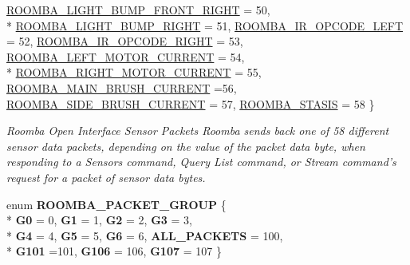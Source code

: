 \begin{DoxyCompactItemize}
\hyperlink{group__roomba-lib_gga46f008b5055c4a08d3123c6a3478373ea94217c4da645d2bed66a8ef46485b776}{R\+O\+O\+M\+B\+A\+\_\+\+L\+I\+G\+H\+T\+\_\+\+B\+U\+M\+P\+\_\+\+F\+R\+O\+N\+T\+\_\+\+R\+I\+G\+H\+T} = 50, 
\\*
\hyperlink{group__roomba-lib_gga46f008b5055c4a08d3123c6a3478373ead32d8a13d2506234d1358f7622725331}{R\+O\+O\+M\+B\+A\+\_\+\+L\+I\+G\+H\+T\+\_\+\+B\+U\+M\+P\+\_\+\+R\+I\+G\+H\+T} = 51, 
\hyperlink{group__roomba-lib_gga46f008b5055c4a08d3123c6a3478373ea9ebd0d5b7b0d25ab79377208546ed5bd}{R\+O\+O\+M\+B\+A\+\_\+\+I\+R\+\_\+\+O\+P\+C\+O\+D\+E\+\_\+\+L\+E\+F\+T} = 52, 
\hyperlink{group__roomba-lib_gga46f008b5055c4a08d3123c6a3478373eaea5b0df07c05b451fc103c732c6e74eb}{R\+O\+O\+M\+B\+A\+\_\+\+I\+R\+\_\+\+O\+P\+C\+O\+D\+E\+\_\+\+R\+I\+G\+H\+T} = 53, 
\hyperlink{group__roomba-lib_gga46f008b5055c4a08d3123c6a3478373eaeadd154f9f2f7647caf3488d27bd4fef}{R\+O\+O\+M\+B\+A\+\_\+\+L\+E\+F\+T\+\_\+\+M\+O\+T\+O\+R\+\_\+\+C\+U\+R\+R\+E\+N\+T} = 54, 
\\*
\hyperlink{group__roomba-lib_gga46f008b5055c4a08d3123c6a3478373ea7a02b4928368639e9bd9fcec9656462b}{R\+O\+O\+M\+B\+A\+\_\+\+R\+I\+G\+H\+T\+\_\+\+M\+O\+T\+O\+R\+\_\+\+C\+U\+R\+R\+E\+N\+T} = 55, 
\hyperlink{group__roomba-lib_gga46f008b5055c4a08d3123c6a3478373ea31137d3179ccc5981923bd6aa8b63b95}{R\+O\+O\+M\+B\+A\+\_\+\+M\+A\+I\+N\+\_\+\+B\+R\+U\+S\+H\+\_\+\+C\+U\+R\+R\+E\+N\+T} =56, 
\hyperlink{group__roomba-lib_gga46f008b5055c4a08d3123c6a3478373ea7c8ef5075b9ed0f0d6699c83d6359952}{R\+O\+O\+M\+B\+A\+\_\+\+S\+I\+D\+E\+\_\+\+B\+R\+U\+S\+H\+\_\+\+C\+U\+R\+R\+E\+N\+T} = 57, 
\hyperlink{group__roomba-lib_gga46f008b5055c4a08d3123c6a3478373ea0e892ee610c71a2a567e51ecd5d1e043}{R\+O\+O\+M\+B\+A\+\_\+\+S\+T\+A\+S\+I\+S} = 58
 \}
\begin{DoxyCompactList}\small\item\em Roomba Open Interface Sensor Packets Roomba sends back one of 58 different sensor data packets, depending on the value of the packet data byte, when responding to a Sensors command, Query List command, or Stream command’s request for a packet of sensor data bytes. \end{DoxyCompactList}\item 
\hypertarget{group__roomba-lib_ga159a5a543d2cf5401e5bd4c44c860ba0}{}enum {\bfseries R\+O\+O\+M\+B\+A\+\_\+\+P\+A\+C\+K\+E\+T\+\_\+\+G\+R\+O\+U\+P} \{ \\*
{\bfseries G0} = 0, 
{\bfseries G1} = 1, 
{\bfseries G2} = 2, 
{\bfseries G3} = 3, 
\\*
{\bfseries G4} = 4, 
{\bfseries G5} = 5, 
{\bfseries G6} = 6, 
{\bfseries A\+L\+L\+\_\+\+P\+A\+C\+K\+E\+T\+S} = 100, 
\\*
{\bfseries G101} =101, 
{\bfseries G106} = 106, 
{\bfseries G107} = 107
 \}\label{group__roomba-lib_ga159a5a543d2cf5401e5bd4c44c860ba0}


\end{DoxyCompactItemize}
